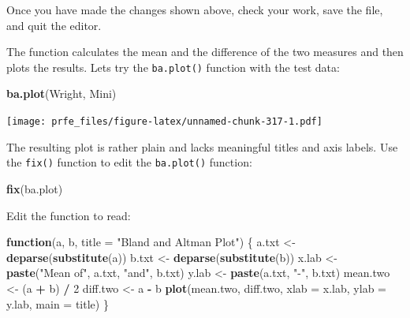 \documentclass[12pt,a4paper]{book}
\newenvironment{Shaded}{\begin{snugshade}}{\end{snugshade}}
\newcommand{\ControlFlowTok}[1]{\textcolor[rgb]{0.13,0.29,0.53}{\textbf{#1}}}
\newcommand{\DataTypeTok}[1]{\textcolor[rgb]{0.13,0.29,0.53}{#1}}
\newcommand{\DecValTok}[1]{\textcolor[rgb]{0.00,0.00,0.81}{#1}}
\newcommand{\KeywordTok}[1]{\textcolor[rgb]{0.13,0.29,0.53}{\textbf{#1}}}
\newcommand{\NormalTok}[1]{#1}
\newcommand{\OperatorTok}[1]{\textcolor[rgb]{0.81,0.36,0.00}{\textbf{#1}}}
\newcommand{\StringTok}[1]{\textcolor[rgb]{0.31,0.60,0.02}{#1}}
\theoremstyle{definition}
\theoremstyle{definition}
\theoremstyle{definition}
\theoremstyle{remark}
\begin{document}
Once you have made the changes shown above, check your work, save the
file, and quit the editor.

The function calculates the mean and the difference of the two measures
and then plots the results. Lets try the \texttt{ba.plot()} function
with the test data:

\begin{Shaded}
\begin{Highlighting}[]
\KeywordTok{ba.plot}\NormalTok{(Wright, Mini)}
\end{Highlighting}
\end{Shaded}

\texttt{[image: prfe\_files/figure-latex/unnamed-chunk-317-1.pdf]}

The resulting plot is rather plain and lacks meaningful titles and axis
labels. Use the \texttt{fix()} function to edit the \texttt{ba.plot()}
function:

\begin{Shaded}
\begin{Highlighting}[]
\KeywordTok{fix}\NormalTok{(ba.plot)}
\end{Highlighting}
\end{Shaded}

Edit the function to read:

\begin{Shaded}
\begin{Highlighting}[]
\ControlFlowTok{function}\NormalTok{(a, b, }\DataTypeTok{title =} \StringTok{"Bland and Altman Plot"}\NormalTok{) \{}
\NormalTok{  a.txt <-}\StringTok{ }\KeywordTok{deparse}\NormalTok{(}\KeywordTok{substitute}\NormalTok{(a))}
\NormalTok{  b.txt <-}\StringTok{ }\KeywordTok{deparse}\NormalTok{(}\KeywordTok{substitute}\NormalTok{(b))}
\NormalTok{  x.lab <-}\StringTok{ }\KeywordTok{paste}\NormalTok{(}\StringTok{"Mean of"}\NormalTok{, a.txt, }\StringTok{"and"}\NormalTok{, b.txt)}
\NormalTok{  y.lab <-}\StringTok{ }\KeywordTok{paste}\NormalTok{(a.txt, }\StringTok{"-"}\NormalTok{, b.txt)}
\NormalTok{  mean.two <-}\StringTok{ }\NormalTok{(a }\OperatorTok{+}\StringTok{ }\NormalTok{b) }\OperatorTok{/}\StringTok{ }\DecValTok{2}
\NormalTok{  diff.two <-}\StringTok{ }\NormalTok{a }\OperatorTok{-}\StringTok{ }\NormalTok{b}
  \KeywordTok{plot}\NormalTok{(mean.two, diff.two, }\DataTypeTok{xlab =}\NormalTok{ x.lab, }\DataTypeTok{ylab =}\NormalTok{ y.lab, }\DataTypeTok{main =}\NormalTok{ title)}
\NormalTok{\}}
\end{Highlighting}
\end{Shaded}
\end{document}
